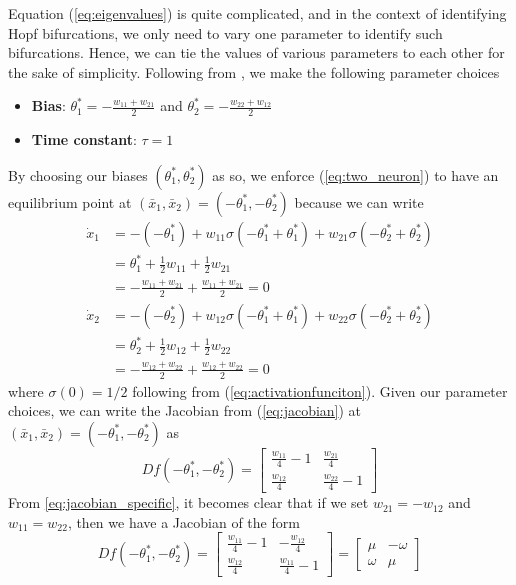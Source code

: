 \documentclass[11pt, letterpaper]{article}
\begin{document}
Equation (\ref{eq:eigenvalues}) is quite complicated, and in the context of identifying Hopf bifurcations, we only need to vary one parameter to identify such bifurcations. Hence, we can tie the values of various parameters to each other for the sake of simplicity. Following from \citet{beer1995dynamics}, we make the following parameter choices
\begin{itemize}
    \item \textbf{Bias}: $\theta^\ast_1=-\frac{w_{11}+w_{21}}{2}$ and $\theta^\ast_2=-\frac{w_{22}+w_{12}}{2}$
    \item \textbf{Time constant}: $\tau=1$
\end{itemize}
By choosing our biases $(\theta^\ast_1,\theta^\ast_2)$ as so, we enforce (\ref{eq:two_neuron}) to have an equilibrium point at $(\bar{x}_1,\bar{x}_2)=(-\theta^\ast_1,-\theta^\ast_2)$ because we can write
\begin{align*}
    \dot{x}_1 &=-\left(-\theta^\ast_1\right) + w_{11}\sigma\left(-\theta^\ast_1+\theta^\ast_1\right) + w_{21}\sigma\left(-\theta^\ast_2+\theta^\ast_2\right)\\
    &=\theta^\ast_1 + \frac{1}{2}w_{11} + \frac{1}{2}w_{21} \\
    &=-\frac{w_{11}+w_{21}}{2} +\frac{w_{11}+w_{21}}{2} =0 \\
    \dot{x}_2 &=-\left(-\theta^\ast_2\right) + w_{12}\sigma\left(-\theta^\ast_1+\theta^\ast_1\right) + w_{22}\sigma\left(-\theta^\ast_2+\theta^\ast_2\right)\\
    &=\theta^\ast_2 + \frac{1}{2}w_{12} + \frac{1}{2}w_{22} \\
    &=-\frac{w_{12}+w_{22}}{2} +\frac{w_{12}+w_{22}}{2} =0
\end{align*}
where $\sigma(0)=1/2$ following from (\ref{eq:activationfunciton}). Given our parameter choices, we can write the Jacobian from (\ref{eq:jacobian}) at $(\bar{x}_1,\bar{x}_2)=(-\theta^\ast_1,-\theta^\ast_2)$ as 
\begin{equation}\label{eq:jacobian_specific}
    Df(-\theta^\ast_1,-\theta^\ast_2) = \begin{bmatrix}
    \frac{w_{11}}{4}-1 & \frac{w_{21}}{4}\\
    \frac{w_{12}}{4} & \frac{w_{22}}{4}-1
    \end{bmatrix}
\end{equation}
From \ref{eq:jacobian_specific}, it becomes clear that if we set $w_{21}=-w_{12}$ and $w_{11}=w_{22}$, then we have a Jacobian of the form
\begin{equation}
    Df(-\theta^\ast_1,-\theta^\ast_2) = \begin{bmatrix}
    \frac{w_{11}}{4}-1 & - \frac{w_{12}}{4}\\
    \frac{w_{12}}{4} & \frac{w_{11}}{4}-1
    \end{bmatrix}=\begin{bmatrix}
        \mu & -\omega \\ \omega & \mu
    \end{bmatrix}
\end{equation}
\end{document}
